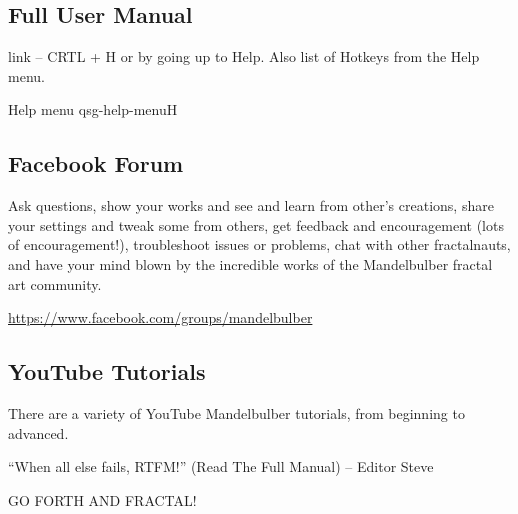 \subsection{Full User Manual}\label{qsg-help}
 link – CRTL + H or by going up to Help. Also list of Hotkeys from the Help menu.

{Help menu}
{qsg-help-menu}{H}

\subsection{Facebook Forum}\label{qsg-facebook}
Ask questions, show your works and see and learn from other’s creations, share your settings and tweak some from others, get feedback and encouragement (lots of encouragement!), troubleshoot issues or problems, chat with other fractalnauts, and have your mind blown by the incredible works of the Mandelbulber fractal art community. 

\href{https://www.facebook.com/groups/mandelbulber}{https://www.facebook.com/groups/mandelbulber}

\subsection{YouTube Tutorials}\label{qsg-youtube} 
There are a variety of YouTube Mandelbulber tutorials, from beginning to advanced.

 

“When all else fails, RTFM!” (Read The Full Manual) – Editor Steve

GO FORTH AND FRACTAL!